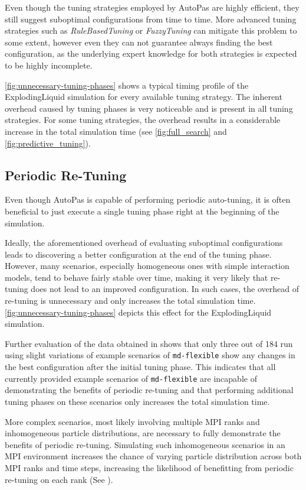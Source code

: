 \documentclass[conference]{IEEEtran}
\begin{document}
Even though the tuning strategies employed by AutoPas are highly efficient, they still suggest suboptimal configurations from time to time. More advanced tuning strategies such as \textit{RuleBasedTuning} or \textit{FuzzyTuning} can mitigate this problem to some extent, however even they can not guarantee always finding the best configuration, as the underlying expert knowledge for both strategies is expected to be highly incomplete.

\autoref{fig:unnecessary-tuning-phases} shows a typical timing profile of the ExplodingLiquid simulation for every available tuning strategy. The inherent overhead caused by tuning phases is very noticeable and is present in all tuning strategies. For some tuning strategies, the overhead results in a considerable increase in the total simulation time (see \autoref{fig:full_search} and \autoref{fig:predictive_tuning}).

\subsection*{Periodic Re-Tuning}

Even though AutoPas is capable of performing periodic auto-tuning, it is often beneficial to just execute a single tuning phase right at the beginning of the simulation.

Ideally, the aforementioned overhead of evaluating suboptimal configurations leads to discovering a better configuration at the end of the tuning phase. However, many scenarios, especially homogeneous ones with simple interaction models, tend to behave fairly stable over time, making it very likely that re-tuning does not lead to an improved configuration. In such cases, the overhead of re-tuning is unnecessary and only increases the total simulation time. \autoref{fig:unnecessary-tuning-phases} depicts this effect for the ExplodingLiquid simulation.

Further evaluation of the data obtained in \cite{lerchner2024} shows that only three out of 184 run using slight variations of example scenarios of \texttt{md-flexible} show any changes in the best configuration after the initial tuning phase. This indicates that all currently provided example scenarios of \texttt{md-flexible} are incapable of demonstrating the benefits of periodic re-tuning and that performing additional tuning phases on these scenarios only increases the total simulation time.

More complex scenarios, most likely involving multiple MPI ranks and inhomogeneous particle distributions, are necessary to fully demonstrate the benefits of periodic re-tuning. Simulating such inhomogeneous scenarios in an MPI environment increases the chance of varying particle distribution across both MPI ranks and time steps, increasing the likelihood of benefitting from periodic re-tuning on each rank (See \cite{Newcome2023Poster}).
\end{document}
